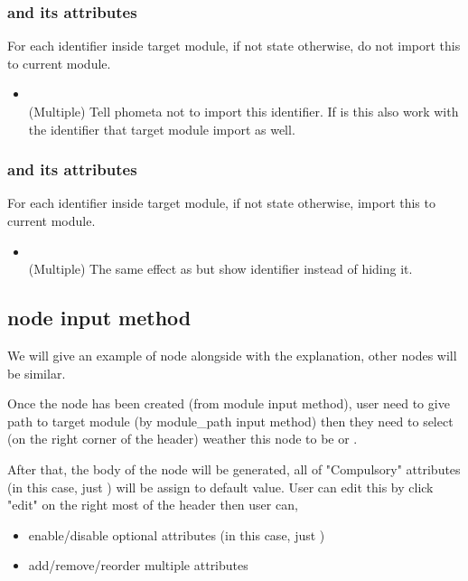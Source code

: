 \subsubsection{\kShowByDefault and its attributes}
For each identifier inside target module, if not state otherwise, do not import this to current module.
\begin{itemize}
    \item \kHide {} \\
    (Multiple) Tell phometa not to import this identifier. If \kRecursive is \kTrue this also work with the identifier that target module import as well.
\end{itemize}

\subsubsection{\kHideByDefault and its attributes}
For each identifier inside target module, if not state otherwise, import this to current module.
\begin{itemize}
    \item \kShow {} \\
    (Multiple) The same effect as \kHide but show identifier instead of hiding it.
\end{itemize}

\subsection{node input method}

We will give an example of \kOpen node alongside with the explanation, other nodes will be similar.

Once the \kOpen node has been created (from module input method), user need to give path to target module (by module\_path input method) then they need to select (on the right corner of the header) weather this \kOpen node to be \kShowByDefault or \kHideByDefault.

After that, the body of the node will be generated, all of "Compulsory" attributes (in this case, just \kRecursive) will be assign to default value. User can edit this by click "edit" on the right most of the header then user can,

\begin{itemize}
    \item enable/disable optional attributes (in this case, just \kComment)
    \item add/remove/reorder multiple attributes
\end{itemize}

